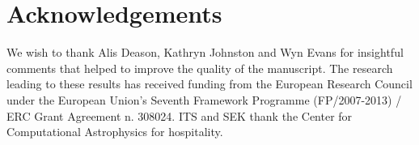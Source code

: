 \documentclass[fleqn,usenatbib]{mnras}
\begin{document}
\section*{Acknowledgements}

We wish to thank Alis Deason, Kathryn Johnston and Wyn Evans for
insightful comments that helped to improve the quality of the
manuscript.  The research leading to these results has received
funding from the European Research Council under the European Union's
Seventh Framework Programme (FP/2007-2013) / ERC Grant Agreement
n. 308024. ITS and SEK thank the Center for Computational Astrophysics
for hospitality.





\bsp	%
\label{lastpage}
\end{document}
